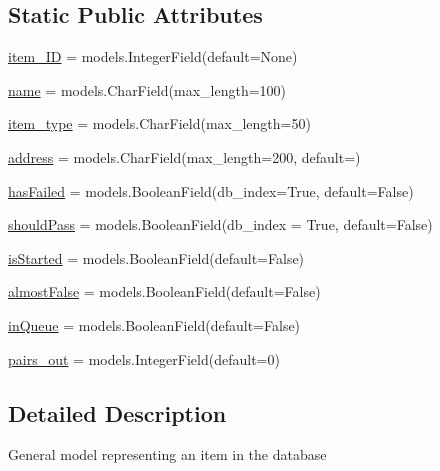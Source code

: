 \subsection*{Static Public Attributes}
\begin{DoxyCompactItemize}
\item 
\mbox{\hyperlink{classdynamicfilterapp_1_1models_1_1_item_a32565a7f740a6d8f36b5e5d781463e15}{item\+\_\+\+ID}} = models.\+Integer\+Field(default=None)
\item 
\mbox{\hyperlink{classdynamicfilterapp_1_1models_1_1_item_ab74e6bf80237ddc4109968cedc58c151}{name}} = models.\+Char\+Field(max\+\_\+length=100)
\item 
\mbox{\hyperlink{classdynamicfilterapp_1_1models_1_1_item_a2679318a14061852e50df3c6e4e42f62}{item\+\_\+type}} = models.\+Char\+Field(max\+\_\+length=50)
\item 
\mbox{\hyperlink{classdynamicfilterapp_1_1models_1_1_item_ade5a18d52133ef21f211020ceb464c07}{address}} = models.\+Char\+Field(max\+\_\+length=200, default=\textquotesingle{}\textquotesingle{})
\item 
\mbox{\hyperlink{classdynamicfilterapp_1_1models_1_1_item_a5fa9cf9c305aeeef558cdf041085ccf1}{has\+Failed}} = models.\+Boolean\+Field(db\+\_\+index=True, default=False)
\item 
\mbox{\hyperlink{classdynamicfilterapp_1_1models_1_1_item_a1abc5225054f7c37dcefe2ca69594650}{should\+Pass}} = models.\+Boolean\+Field(db\+\_\+index = True, default=False)
\item 
\mbox{\hyperlink{classdynamicfilterapp_1_1models_1_1_item_a4dfad4da8b9c480e78a3ad161ce723f1}{is\+Started}} = models.\+Boolean\+Field(default=False)
\item 
\mbox{\hyperlink{classdynamicfilterapp_1_1models_1_1_item_a088a878065d2b8209b1c4a23f482b70a}{almost\+False}} = models.\+Boolean\+Field(default=False)
\item 
\mbox{\hyperlink{classdynamicfilterapp_1_1models_1_1_item_af5ba33bf8fddcc8f610ee2d0091ded53}{in\+Queue}} = models.\+Boolean\+Field(default=False)
\item 
\mbox{\hyperlink{classdynamicfilterapp_1_1models_1_1_item_a9290ec0d1f62bda2041497209d4f9895}{pairs\+\_\+out}} = models.\+Integer\+Field(default=0)
\end{DoxyCompactItemize}


\subsection{Detailed Description}
\begin{DoxyVerb}General model representing an item in the database
\end{DoxyVerb}
 

